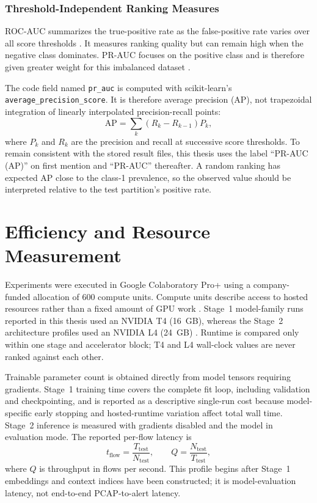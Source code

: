 \documentclass[11pt,fleqn]{report}
\begin{document}
\subsubsection{Threshold-Independent Ranking Measures}
\label{subsubsec:ranking_metrics}

ROC-AUC summarizes the true-positive rate as the false-positive rate varies
over all score thresholds \cite{Fawcett2006ROC}. It measures ranking quality
but can remain high when the negative class dominates. PR-AUC focuses on the
positive class and is therefore given greater weight for this imbalanced
dataset \cite{SaitoRehmsmeier2015}.

The code field named \texttt{pr\_auc} is computed with scikit-learn's
\texttt{average\_precision\_score}. It is therefore average precision (AP),
not trapezoidal integration of linearly interpolated precision-recall points:
\begin{equation}
    \mathrm{AP}=\sum_{k}(R_k-R_{k-1})P_k,
    \label{eq:average_precision}
\end{equation}
where $P_k$ and $R_k$ are the precision and recall at successive score
thresholds. To remain consistent with the stored result files, this thesis
uses the label ``PR-AUC (AP)'' on first mention and ``PR-AUC'' thereafter. A
random ranking has expected AP close to the class-1 prevalence, so the observed
value should be interpreted relative to the test partition's positive rate.

\section{Efficiency and Resource Measurement}
\label{subsec:efficiency_protocol}

Experiments were executed in Google Colaboratory Pro+ using a company-funded
allocation of 600 compute units. Compute units describe access to hosted
resources rather than a fixed amount of GPU work \cite{GoogleColabFAQ2026}.
Stage~1 model-family runs reported in this thesis used an NVIDIA T4 (16~GB),
whereas the Stage~2 architecture profiles used an NVIDIA L4 (24~GB)
\cite{NVIDIAT4Datasheet,NVIDIAL4ProductBrief}. Runtime is compared only within
one stage and accelerator block; T4 and L4 wall-clock values are never ranked
against each other.

Trainable parameter count is obtained directly from model tensors requiring
gradients. Stage~1 training time covers the complete fit loop, including
validation and checkpointing, and is reported as a descriptive single-run cost
because model-specific early stopping and hosted-runtime variation affect total
wall time. Stage~2 inference is measured with gradients disabled and the model
in evaluation mode. The reported per-flow latency is
\begin{equation}
    t_{\mathrm{flow}}=\frac{T_{\mathrm{test}}}{N_{\mathrm{test}}},
    \qquad
    Q=\frac{N_{\mathrm{test}}}{T_{\mathrm{test}}},
    \label{eq:inference_efficiency}
\end{equation}
where $Q$ is throughput in flows per second. This profile begins after Stage~1
embeddings and context indices have been constructed; it is model-evaluation
latency, not end-to-end PCAP-to-alert latency.
\end{document}
